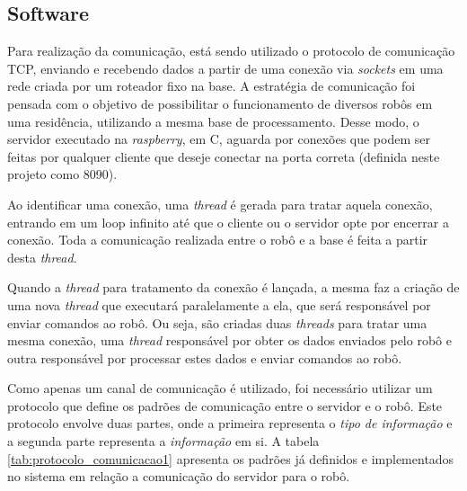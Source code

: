 	\subsection{Software} %
	\label{sub:software}
		
		Para realização da comunicação, está sendo utilizado o protocolo de comunicação TCP, enviando e recebendo dados a partir de uma conexão via \textit{sockets} em uma rede criada por um roteador fixo na base. A estratégia de comunicação foi pensada com o objetivo de possibilitar o funcionamento de diversos robôs em uma residência, utilizando a mesma base de processamento. Desse modo, o servidor executado na \textit{raspberry}, em C, aguarda por conexões que podem ser feitas por qualquer cliente que deseje conectar na porta correta (definida neste projeto como 8090).

		Ao identificar uma conexão, uma \textit{thread} é gerada para tratar aquela conexão, entrando em um loop infinito até que o cliente ou o servidor opte por encerrar a conexão. Toda a comunicação realizada entre o robô e a base é feita a partir desta \textit{thread}.

		Quando a \textit{thread} para tratamento da conexão é lançada, a mesma faz a criação de uma nova \textit{thread} que executará paralelamente a ela, que será responsável por enviar comandos ao robô. Ou seja, são criadas duas \textit{threads} para tratar uma mesma conexão, uma \textit{thread} responsável por obter os dados enviados pelo robô e outra responsável por processar estes dados e enviar comandos ao robô.

		Como apenas um canal de comunicação é utilizado, foi necessário utilizar um protocolo que define os padrões de comunicação entre o servidor e o robô. Este protocolo envolve duas partes, onde a primeira representa o \textit{tipo de informação} e a segunda parte representa a \textit{informação} em si. A tabela \ref{tab:protocolo_comunicacao1} apresenta os padrões já definidos e implementados no sistema em relação a comunicação do servidor para o robô.


